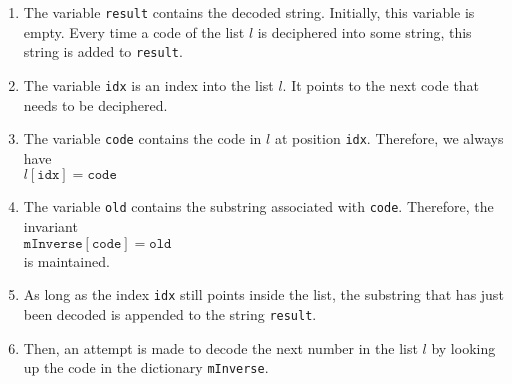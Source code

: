 \begin{enumerate}
\item The variable \texttt{result} contains the decoded string.  Initially, this variable is empty.
      Every time a code of the list $l$ is deciphered into some string, this string is added to
      \texttt{result}.
\item The variable \texttt{idx} is an index into the list $l$.  It points to the next code that
      needs to be deciphered.
\item The variable \texttt{code} contains the code in $l$ at position \texttt{idx}.  Therefore, we
      always have
      \\[0.2cm]
      \hspace*{1.3cm}
      $l[\mathtt{idx}] = \mathtt{code}$
\item The variable \texttt{old} contains the substring associated with \texttt{code}.  Therefore,
      the invariant
      \\[0.2cm]
      \hspace*{1.3cm}
      $\texttt{mInverse}[\mathtt{code}] = \mathtt{old}$
      \\[0.2cm]
      is maintained.
\item As long as the index \texttt{idx} still points inside the list, the substring 
      that has just been decoded is appended to the string \texttt{result}.
\item Then, an attempt is made to decode the next number in the list $l$ by looking up the code
      in the dictionary \texttt{mInverse}.  
      

\end{enumerate}
